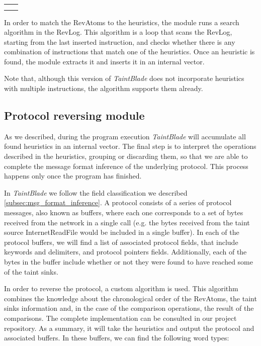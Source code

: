 \documentclass[conference]{IEEEtran}
\begin{document}
\begin{table}[htbp]
\begin{center}
\begin{tabular}{|>{\centering\arraybackslash}p{1.5cm}|>{\centering\arraybackslash}p{6.3cm}|}
                               &                                                                       \\
                               &                                                                       \\
            \hline
        \end{tabular}
        \label{tab1}
    \end{center}
    \label{table:implemented_heuristics}
\end{table}

In order to match the RevAtoms to the heuristics, the module runs a search
algorithm in the RevLog. This algorithm is a loop that scans the RevLog, starting
from the last inserted instruction, and checks whether there is any combination
of instructions that match one of the heuristics. Once an heuristic is found, 
the module extracts it and inserts it in an internal vector. 

Note that, although this
version of \textit{TaintBlade} does not incorporate heuristics with multiple
instructions, the algorithm supports them already.

\subsection{Protocol reversing module}
As we described, during the program execution \textit{TaintBlade} will
accumulate all found heuristics in an internal vector. The final step is to
interpret the operations described in the heuristics, grouping or discarding
them, so that we are able to complete the message format inference of the
underlying protocol. This process happens only once the program has finished.

In \textit{TaintBlade} we follow the field classification we described \ref{subsec:msg_format_inference}.
A protocol consists of a series of protocol messages, also known as buffers,
where each one corresponds to a set of bytes received from the network in a
single call (e.g. the bytes received from the taint source InternetReadFile
would be included in a single buffer). In each of the protocol buffers, we will
find a list of associated protocol fields, that include keywords and delimiters,
and protocol pointers fields. Additionally, each of the bytes in the buffer
include whether or not they were found to have reached some of the taint sinks.

In order to reverse the protocol, a custom algorithm is used. This algorithm
combines the knowledge about the chronological order of the RevAtoms, the taint
sinks information and, in the case of the comparison operations, the result of
the comparisons. The complete implementation can be consulted in our project repository.
As a summary, it will take the heuristics and output the protocol and
associated buffers. In these buffers, we can find the following word types:
\end{document}
